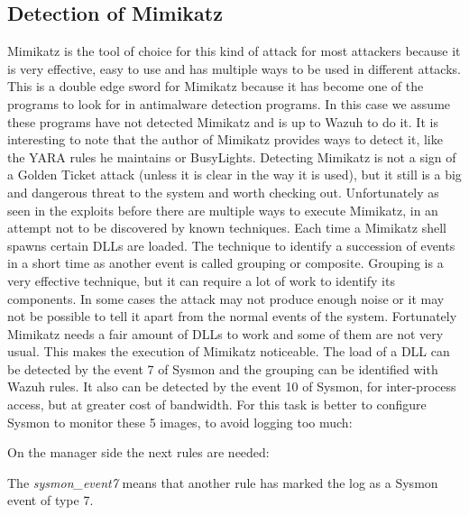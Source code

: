 \subsection{Detection of Mimikatz}
Mimikatz is the tool of choice for this kind of attack for most attackers because it is very effective, easy to use and has multiple ways to be used in different attacks\cite{mimikatz_github}\cite{mimikatz_details}. This is a double edge sword for Mimikatz because it has become one of the programs to look for in antimalware detection programs. In this case we assume these programs have not detected Mimikatz and is up to Wazuh to do it. It is interesting to note that the author of Mimikatz provides ways to detect it, like the YARA rules he maintains\cite{mimikatz_github} or BusyLights\cite{understanding_powersploit_mimikatz}.
\linej
\linej
Detecting Mimikatz is not a sign of a Golden Ticket attack (unless it is clear in the way it is used), but it still is a big and dangerous threat to the system and worth checking out.
\linej
Unfortunately as seen in the exploits before there are multiple ways to execute Mimikatz, in an attempt not to be discovered by known techniques.
\linej
\linej
Each time a Mimikatz shell spawns certain DLLs are loaded. The technique to identify a succession of events in a short time as another event is called grouping or composite.
Grouping is a very effective technique, but it can require a lot of work to identify its components. In some cases the attack may not produce enough noise or it may not be possible to tell it apart from the normal events of the system\cite{sysmon}\cite{sysmon_event_7_mimikatz}.
\linej
Fortunately Mimikatz needs a fair amount of DLLs to work and some of them are not very usual. This makes the execution of Mimikatz noticeable.
\linej
\linej
The load of a DLL can be detected by the event 7 of Sysmon and the grouping can be identified with Wazuh rules. It also can be detected by the event 10 of Sysmon, for inter-process access, but at greater cost of bandwidth.
For this task is better to configure Sysmon to monitor these 5 images, to avoid logging too much:
\linej

\linej
On the manager side the next rules are needed:
\linej

The \textit{sysmon\_event7} means that another rule has marked the log as a Sysmon event of type 7.
